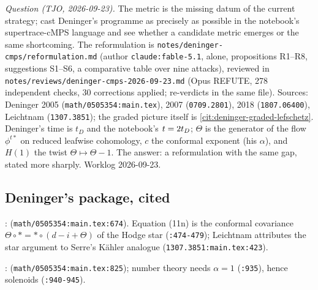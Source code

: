 \emph{Question (TJO, 2026-09-23).} The metric is the missing datum of the current strategy; cast Deninger's
programme as precisely as possible in the notebook's supertrace-cMPS language and see whether a candidate metric
emerges or the same shortcoming. The reformulation is \texttt{notes/deninger-cmps/reformulation.md} (author
\texttt{claude:fable-5.1}, alone, propositions R1--R8, suggestions S1--S6, a comparative table over nine
attacks), reviewed in \texttt{notes/reviews/deninger-cmps-2026-09-23.md} (Opus REFUTE, 278 independent checks,
30 corrections applied; re-verdicts in the same file). Sources: Deninger 2005 \cite{deninger2005foliated}
(\texttt{math/0505354:main.tex}), 2007 \cite{deninger2007analogies} (\texttt{0709.2801}), 2018
\cite{deninger2018dynamical} (\texttt{1807.06400}), Leichtnam \cite{leichtnam2013analogy}
(\texttt{1307.3851}); the graded picture itself is \cref{cit:deninger-graded-lefschetz}. Deninger's time is
$t_D$ and the notebook's $t = 2t_D$; $\Theta$ is the generator of the flow $\phi^{t*}$ on reduced leafwise
cohomology, $c$ the conformal exponent (his $\alpha$), and $H(1)$ the twist $\Theta\mapsto\Theta-1$. The answer: %
a reformulation with the same gap, stated more sharply. Worklog 2026-09-23.

\subsection{Deninger's package, cited}

\begin{citedfact}
\label{cit:deninger-conformal-metric}
\cite{deninger2005foliated}: \texttt{}
(\texttt{math/0505354:main.tex:674}). Equation (11n) is the conformal covariance $\Theta\circ* = *\circ(d-i+\Theta)$
of the Hodge star (\texttt{:474-479}); Leichtnam attributes the star argument to Serre's K\"ahler analogue
(\texttt{1307.3851:main.tex:423}).
\end{citedfact}

\begin{citedfact}
\label{cit:deninger-alpha-zero}
\cite{deninger2005foliated}: \texttt{}
(\texttt{math/0505354:main.tex:825}); number theory needs $\alpha = 1$ (\texttt{:935}), hence solenoids (\texttt{:940-945}). %
\end{citedfact}

